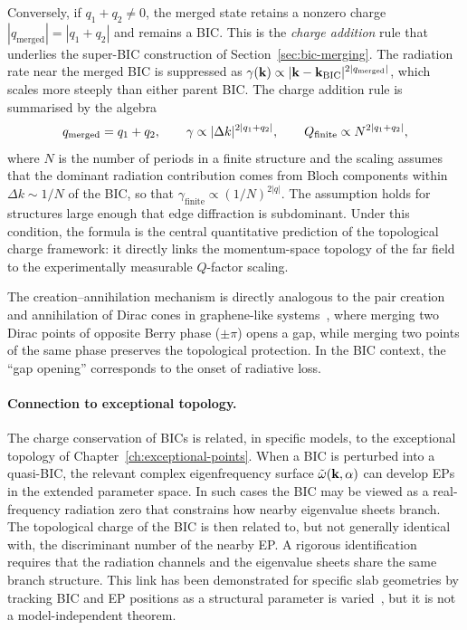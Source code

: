 Conversely, if $q_1 + q_2 \neq 0$, the merged state retains a nonzero
charge $|q_{\mathrm{merged}}| = |q_1 + q_2|$ and remains a BIC. This
is the \emph{charge addition} rule that underlies the super-BIC
construction of Section~\ref{sec:bic-merging}. The radiation rate near
the merged BIC is suppressed as
$\gamma(\mathbf{k}) \propto |\mathbf{k} - \mathbf{k}_{\mathrm{BIC}}|^{2|q_{\mathrm{merged}}|}$,
which scales more steeply than either parent BIC. The charge addition
rule is summarised by the algebra
\begin{equation}
 q_{\mathrm{merged}} = q_1 + q_2, \qquad
   \gamma \propto |\Delta k|^{2|q_1 + q_2|}, \qquad
 Q_{\mathrm{finite}} \propto N^{2|q_1 + q_2|},
 \label{eq:charge-algebra}
\end{equation}
where $N$ is the number of periods in a finite structure and the
scaling assumes that the dominant radiation contribution comes from
Bloch components within $\Delta k \sim 1/N$ of the BIC, so that
$\gamma_{\mathrm{finite}} \propto (1/N)^{2|q|}$.  The assumption holds
for structures large enough that edge diffraction is subdominant.  Under
this condition, the formula is the central quantitative prediction of
the topological charge framework: it directly links the momentum-space
topology of the far field to the experimentally measurable $Q$-factor
scaling.

The creation--annihilation mechanism is directly analogous to the
pair creation and annihilation of Dirac cones in graphene-like
systems~\cite{guinea2009energy}, where merging two Dirac points of
opposite Berry phase ($\pm\pi$) opens a gap, while merging two points
of the same phase preserves the topological protection. In the BIC
context, the ``gap opening'' corresponds to the onset of radiative loss.

\paragraph{Connection to exceptional topology.}
The charge conservation of BICs is related, in specific models, to the
exceptional topology of Chapter~\ref{ch:exceptional-points}. When a BIC
is perturbed into a quasi-BIC, the relevant complex eigenfrequency
surface $\tilde{\omega}(\mathbf{k},\alpha)$ can develop EPs in the extended parameter
space. In such cases the BIC may be viewed as a real-frequency radiation
zero that constrains how nearby eigenvalue sheets branch. The
topological charge of the BIC is then related to, but not generally
identical with, the discriminant number of the nearby EP. A rigorous
identification requires that the radiation channels and the eigenvalue
sheets share the same branch structure. This link has been demonstrated
for specific slab geometries by tracking BIC and EP positions as a
structural parameter is varied~\cite{zhen2015spawning}, but it is not a
model-independent theorem.

